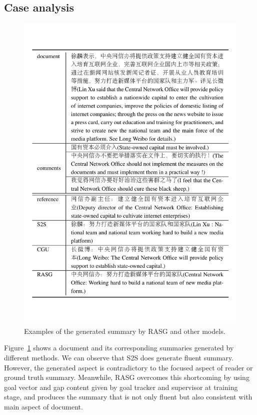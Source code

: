 \documentclass[letterpaper]{article} %
\begin{document}
\subsection{Case analysis}

\begin{figure}[!t]
    \centering
    \includegraphics[width=\linewidth]{figs/case.pdf}
    \caption{Examples of the generated summary by RASG and other models.}
    \label{tab:case}
\end{figure}

Figure~\ref{tab:case} shows a document and its corresponding summaries generated by different methods.
We can observe that S2S does generate fluent summary. 
However, the generated aspect is contradictory to the focused aspect of reader or ground truth summary.
Meanwhile, RASG overcomes this shortcoming by using goal vector and gap content given by goal tracker and supervisor at training stage, and produces the summary that is not only fluent but also consistent with main aspect of document.
\end{document}
